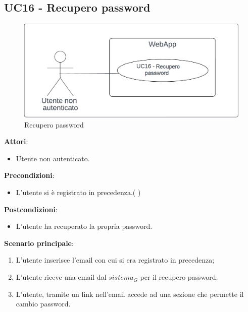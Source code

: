 \subsection{UC16 - Recupero password} \label{usecase:16}
\begin{figure}[H]
    \centering
    \includegraphics[width=0.9\linewidth]{ucd/ucd16.png}
    \caption{Recupero password}
\end{figure}
\textbf{Attori}:
\begin{itemize}
    \item Utente non autenticato.
\end{itemize}
\textbf{Precondizioni}:
\begin{itemize}
    \item L'utente si è registrato in precedenza.( )
\end{itemize}
\textbf{Postcondizioni}:
\begin{itemize}
    \item L'utente ha recuperato la propria password.
\end{itemize}
\textbf{Scenario principale}:
\begin{enumerate}
    \item L'utente inserisce l'email con cui si era registrato in precedenza;
    \item L'utente riceve una email dal $\textit{sistema}_G$ per il recupero password;
    \item L'utente, tramite un link nell'email accede ad una sezione che permette il cambio password.
\end{enumerate}
\newpage